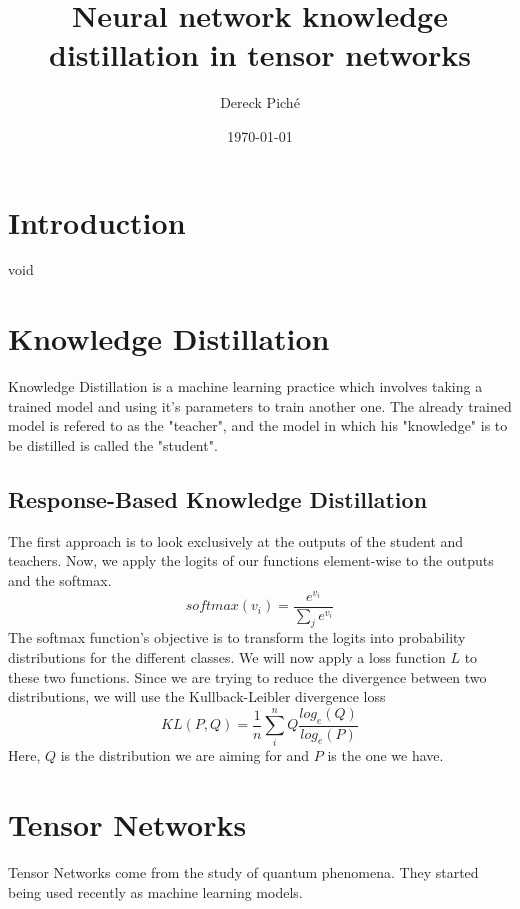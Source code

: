 \documentclass[11pt]{article}
\title{Neural network knowledge distillation in tensor networks}
\author{Dereck Piché}
\date{\today}
\begin{document}
\maketitle
\begin{abstract}
\end{abstract}

\section{Introduction}
void


\section{Knowledge Distillation}
Knowledge Distillation is a machine learning practice which involves
taking a trained model and using it's parameters to train another one.
The already trained model is refered to as the "teacher", and 
the model in which his "knowledge" is to be distilled is called the "student".

\subsection{Response-Based Knowledge Distillation}
The first approach is to look exclusively at the outputs
of the student and teachers. Now, we apply the logits
of our functions element-wise to the outputs and the softmax.
\begin{equation}
    softmax(v_i) = \frac{e^{v_i}}{\sum_{j}{e^{v_i}}}
\end{equation}
The softmax function's objective is to transform the logits
into probability distributions for the different classes.
We will now apply a loss function $L$ to these two functions.
Since we are trying to reduce the divergence between 
two distributions, we will use the Kullback-Leibler divergence loss
\begin{equation}
    KL(P, Q) = \frac{1}{n} \sum_i^n Q \frac{log_e(Q)}{log_e(P)}
\end{equation}
Here, $Q$ is the distribution we are aiming for and $P$ is the one we have.



\section{Tensor Networks}
Tensor Networks come from the study of quantum phenomena. They 
started being used recently as machine learning models.
\end{document}
